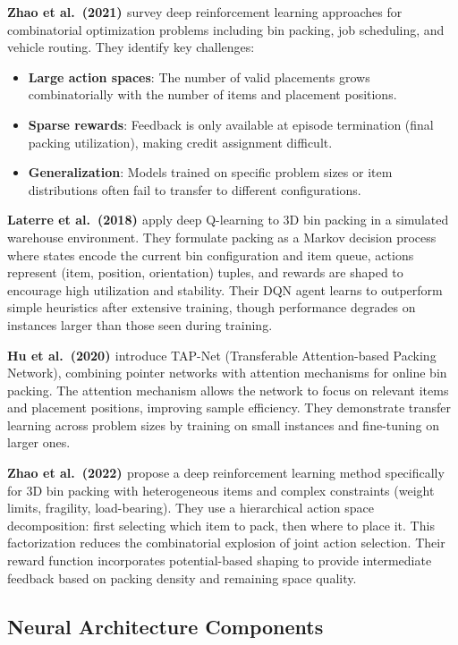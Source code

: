 \textbf{Zhao et al.\ (2021) \cite{ZTL+21}} survey deep reinforcement learning approaches for combinatorial optimization problems including bin packing, job scheduling, and vehicle routing. They identify key challenges:
\begin{itemize}
\item \textbf{Large action spaces}: The number of valid placements grows combinatorially with the number of items and placement positions.
\item \textbf{Sparse rewards}: Feedback is only available at episode termination (final packing utilization), making credit assignment difficult.
\item \textbf{Generalization}: Models trained on specific problem sizes or item distributions often fail to transfer to different configurations.
\end{itemize}

\textbf{Laterre et al.\ (2018) \cite{LFU+18}} apply deep Q-learning to 3D bin packing in a simulated warehouse environment. They formulate packing as a Markov decision process where states encode the current bin configuration and item queue, actions represent (item, position, orientation) tuples, and rewards are shaped to encourage high utilization and stability. Their DQN agent learns to outperform simple heuristics after extensive training, though performance degrades on instances larger than those seen during training.

\textbf{Hu et al.\ (2020) \cite{HZZ+20}} introduce TAP-Net (Transferable Attention-based Packing Network), combining pointer networks with attention mechanisms for online bin packing. The attention mechanism allows the network to focus on relevant items and placement positions, improving sample efficiency. They demonstrate transfer learning across problem sizes by training on small instances and fine-tuning on larger ones.

\textbf{Zhao et al.\ (2022) \cite{ZXL+22}} propose a deep reinforcement learning method specifically for 3D bin packing with heterogeneous items and complex constraints (weight limits, fragility, load-bearing). They use a hierarchical action space decomposition: first selecting which item to pack, then where to place it. This factorization reduces the combinatorial explosion of joint action selection. Their reward function incorporates potential-based shaping to provide intermediate feedback based on packing density and remaining space quality.

\subsection{Neural Architecture Components}

